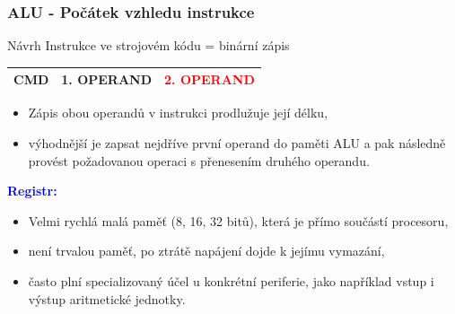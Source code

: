 	\begin{frame}
    \frametitle{ALU - Počátek vzhledu instrukce}
		
		Návrh Instrukce ve strojovém kódu = binární zápis
		
		\begin{center}
			\begin{tabular}{| c | c | c |}
				\hline
				\textbf{CMD} & \textbf{1. OPERAND} & \textcolor{red}{\textbf{2. OPERAND}}\\
				\hline
			\end{tabular}
		\end{center}
		
		
		\begin{itemize}
			\item Zápis obou operandů v instrukci prodlužuje její délku,
			\item výhodnější je zapsat nejdříve první operand do paměti ALU a pak následně provést požadovanou operaci s přenesením druhého operandu.
		\end{itemize}
		
		\vspace{1mm}
		\textcolor{blue}{\textbf{Registr:}}
		
		\begin{itemize}
			\item Velmi rychlá malá paměť (8, 16, 32 bitů), která je přímo součástí procesoru,
			\item není trvalou paměť, po ztrátě napájení dojde k jejímu vymazání,
			\item často plní specializovaný účel u konkrétní periferie, jako například vstup i výstup aritmetické jednotky.
		\end{itemize}
	\end{frame}

